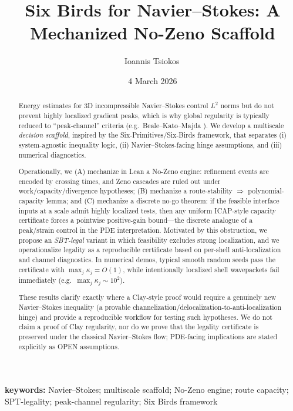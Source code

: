 \documentclass[11pt]{article}
\title{Six Birds for Navier--Stokes: A Mechanized No-Zeno Scaffold}
\author{Ioannis Tsiokos\,\orcidlink{0009-0009-7659-5964}}
\date{4 March 2026}
\newcommand{\printaffiliation}{\begin{center}\small \end{center}}
\begin{document}
\maketitle
\thispagestyle{firstpage}
\printaffiliation

\begin{abstract}
Energy estimates for 3D incompressible Navier--Stokes control $L^2$ norms but do not prevent
highly localized gradient peaks, which is why global regularity is typically reduced to
``peak-channel'' criteria (e.g.\ Beale--Kato--Majda \citep{bkm_1984}).
We develop a multiscale \emph{decision scaffold}, inspired by the Six-Primitives/Six-Birds framework,
that separates (i) system-agnostic inequality logic, (ii) Navier--Stokes-facing hinge assumptions,
and (iii) numerical diagnostics.

Operationally, we (A) mechanize in Lean a No-Zeno engine: refinement events are encoded by crossing
times, and Zeno cascades are ruled out under work/capacity/divergence hypotheses; (B) mechanize a
route-stability $\Rightarrow$ polynomial-capacity lemma; and (C) mechanize a discrete no-go theorem:
if the feasible interface inputs at a scale admit highly localized tests, then any uniform ICAP-style
capacity certificate forces a pointwise positive-gain bound---the discrete analogue of a peak/strain
control in the PDE interpretation.
Motivated by this obstruction, we propose an \emph{SBT-legal} variant in which feasibility excludes
strong localization, and we operationalize legality as a reproducible certificate based on
per-shell anti-localization and channel diagnostics.
In numerical demos, typical smooth random seeds pass the certificate with $\max_j \kappa_j=O(1)$,
while intentionally localized shell wavepackets fail immediately (e.g.\ $\max_j\kappa_j\sim 10^2$).

These results clarify exactly where a Clay-style proof would require a genuinely new Navier--Stokes
inequality (a provable channelization/delocalization-to-anti-localization hinge) and provide a
reproducible workflow for testing such hypotheses.
We do not claim a proof of Clay regularity, nor do we prove that the legality certificate is preserved
under the classical Navier--Stokes flow; PDE-facing implications are stated explicitly as OPEN
assumptions.
\end{abstract}

\noindent\textbf{keywords:} Navier--Stokes; multiscale scaffold; No-Zeno engine; route capacity; SPT-legality; peak-channel regularity; Six Birds framework
 
\end{document}
